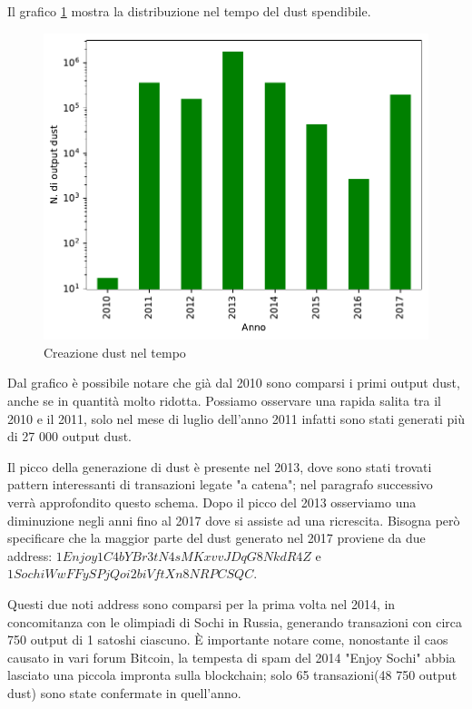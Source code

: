 Il grafico \ref{fig:dust_created} mostra la distribuzione nel tempo del dust spendibile.
\begin{figure}[h!]
    \centering
    \includegraphics[scale=0.9]{Grafici/dust_created_year.pdf}
    \caption{Creazione dust nel tempo}
    \label{fig:dust_created}
\end{figure}
\FloatBarrier 
Dal grafico è possibile notare che già dal 2010 sono comparsi i primi output dust, anche se in quantità molto ridotta. Possiamo osservare una rapida salita tra il 2010 e il 2011, solo nel mese di luglio dell'anno 2011 infatti sono stati generati più di 27 000 output dust.

Il picco della generazione di dust è presente nel 2013, dove sono stati trovati pattern interessanti di transazioni legate "a catena"; nel paragrafo successivo verrà approfondito questo schema. Dopo il picco del 2013 osserviamo una diminuzione negli anni fino al 2017 dove si assiste ad una ricrescita. Bisogna però specificare che la maggior parte del dust generato nel 2017 proviene da due address: $1Enjoy1C4bYBr3tN4sMKxvvJDqG8NkdR4Z$ e $1SochiWwFFySPjQoi2biVftXn8NRPCSQC$.

Questi due noti address sono comparsi per la prima volta nel 2014, in concomitanza con le olimpiadi di Sochi in Russia, generando transazioni con circa 750 output di 1 satoshi ciascuno. È importante notare come, nonostante il caos causato in vari forum Bitcoin, la tempesta di spam del 2014 "Enjoy Sochi" abbia lasciato una piccola impronta sulla blockchain; solo 65 transazioni(48 750 output dust) sono state confermate in quell'anno.

